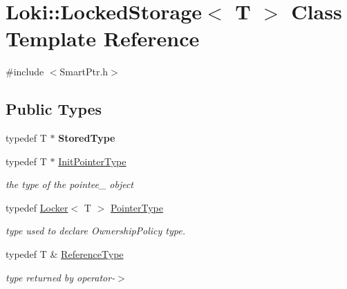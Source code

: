 \hypertarget{classLoki_1_1LockedStorage}{}\section{Loki\+:\+:Locked\+Storage$<$ T $>$ Class Template Reference}
\label{classLoki_1_1LockedStorage}


{\ttfamily \#include $<$Smart\+Ptr.\+h$>$}

\subsection*{Public Types}
\begin{DoxyCompactItemize}
\item 
\hypertarget{classLoki_1_1LockedStorage_a4c054f5a5c2140598bb851f61ed4ad1a}{}typedef T $\ast$ {\bfseries Stored\+Type}\label{classLoki_1_1LockedStorage_a4c054f5a5c2140598bb851f61ed4ad1a}

\item 
\hypertarget{classLoki_1_1LockedStorage_a77b3c2a08c0d43a83b447d9c2c34bbb6}{}typedef T $\ast$ \hyperlink{classLoki_1_1LockedStorage_a77b3c2a08c0d43a83b447d9c2c34bbb6}{Init\+Pointer\+Type}\label{classLoki_1_1LockedStorage_a77b3c2a08c0d43a83b447d9c2c34bbb6}

\begin{DoxyCompactList}\small\item\em the type of the pointee\+\_\+ object \end{DoxyCompactList}\item 
\hypertarget{classLoki_1_1LockedStorage_a88844c5eb40b576359da4234b76702d8}{}typedef \hyperlink{classLoki_1_1Locker}{Locker}$<$ T $>$ \hyperlink{classLoki_1_1LockedStorage_a88844c5eb40b576359da4234b76702d8}{Pointer\+Type}\label{classLoki_1_1LockedStorage_a88844c5eb40b576359da4234b76702d8}

\begin{DoxyCompactList}\small\item\em type used to declare Ownership\+Policy type. \end{DoxyCompactList}\item 
\hypertarget{classLoki_1_1LockedStorage_a5ffd134a01c0a2a7b0450f7969c89a2c}{}typedef T \& \hyperlink{classLoki_1_1LockedStorage_a5ffd134a01c0a2a7b0450f7969c89a2c}{Reference\+Type}\label{classLoki_1_1LockedStorage_a5ffd134a01c0a2a7b0450f7969c89a2c}

\begin{DoxyCompactList}\small\item\em type returned by operator-\/$>$ \end{DoxyCompactList}\end{DoxyCompactItemize}

